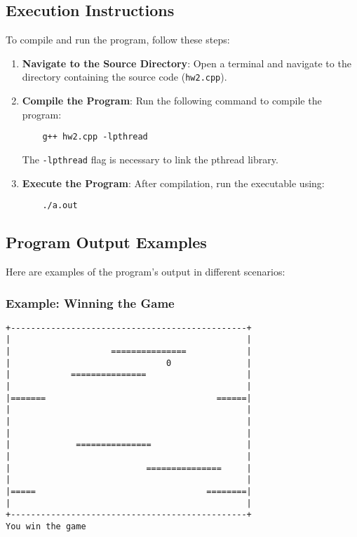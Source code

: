 \documentclass{article}
\begin{document}
\subsection{Execution Instructions}
To compile and run the program, follow these steps:

\begin{enumerate}
    \item \textbf{Navigate to the Source Directory}: Open a terminal and navigate to the directory containing the source code (\texttt{hw2.cpp}).
    \item \textbf{Compile the Program}: Run the following command to compile the program:
    \begin{verbatim}
    g++ hw2.cpp -lpthread
    \end{verbatim}
    The \texttt{-lpthread} flag is necessary to link the pthread library.
    \item \textbf{Execute the Program}: After compilation, run the executable using:
    \begin{verbatim}
    ./a.out
    \end{verbatim}
\end{enumerate}

\subsection{Program Output Examples}
Here are examples of the program's output in different scenarios:

\subsubsection{Example: Winning the Game}
\begin{verbatim}
+-----------------------------------------------+
|                                               |
|                    ===============            |
|                               0               |
|            ===============                    |
|                                               |
|=======                                  ======|
|                                               |
|                                               |
|                                               |
|             ===============                   |
|                                               |
|                           ===============     |
|                                               |
|=====                                  ========|
|                                               |
+-----------------------------------------------+
You win the game
\end{verbatim}
\end{document}
